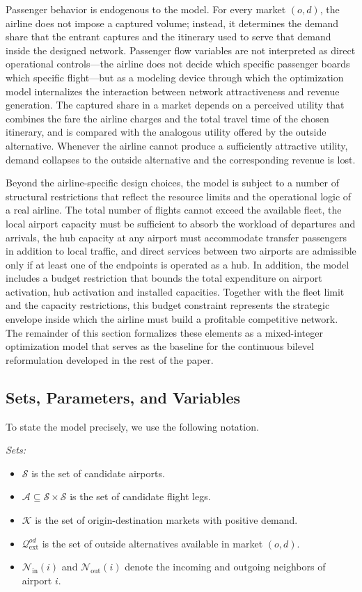 Passenger behavior is endogenous to the model. For every market $(o,d)$, the airline does not impose a captured volume; instead, it determines the demand share that the entrant captures and the itinerary used to serve that demand inside the designed network. Passenger flow variables are not interpreted as direct operational controls---the airline does not decide which specific passenger boards which specific flight---but as a modeling device through which the optimization model internalizes the interaction between network attractiveness and revenue generation. The captured share in a market depends on a perceived utility that combines the fare the airline charges and the total travel time of the chosen itinerary, and is compared with the analogous utility offered by the outside alternative. Whenever the airline cannot produce a sufficiently attractive utility, demand collapses to the outside alternative and the corresponding revenue is lost.

Beyond the airline-specific design choices, the model is subject to a number of structural restrictions that reflect the resource limits and the operational logic of a real airline. The total number of flights cannot exceed the available fleet, the local airport capacity must be sufficient to absorb the workload of departures and arrivals, the hub capacity at any airport must accommodate transfer passengers in addition to local traffic, and direct services between two airports are admissible only if at least one of the endpoints is operated as a hub. In addition, the model includes a budget restriction that bounds the total expenditure on airport activation, hub activation and installed capacities. Together with the fleet limit and the capacity restrictions, this budget constraint represents the strategic envelope inside which the airline must build a profitable competitive network. The remainder of this section formalizes these elements as a mixed-integer optimization model that serves as the baseline for the continuous bilevel reformulation developed in the rest of the paper.

\subsection{Sets, Parameters, and Variables}
To state the model precisely, we use the following notation.

\bigskip
\noindent \textit{Sets:}
\begin{itemize}
\item $\mathcal{S}$ is the set of candidate airports.
\item $\mathcal{A}\subseteq\mathcal{S}\times\mathcal{S}$ is the set of candidate flight legs.
\item $\mathcal{K}$ is the set of origin-destination markets with positive demand.
\item $\mathcal{Q}_{\mathrm{ext}}^{od}$ is the set of outside alternatives available in market $(o,d)$.
\item $\mathcal{N}_{\mathrm{in}}(i)$ and $\mathcal{N}_{\mathrm{out}}(i)$ denote the incoming and outgoing neighbors of airport $i$.
\end{itemize}

